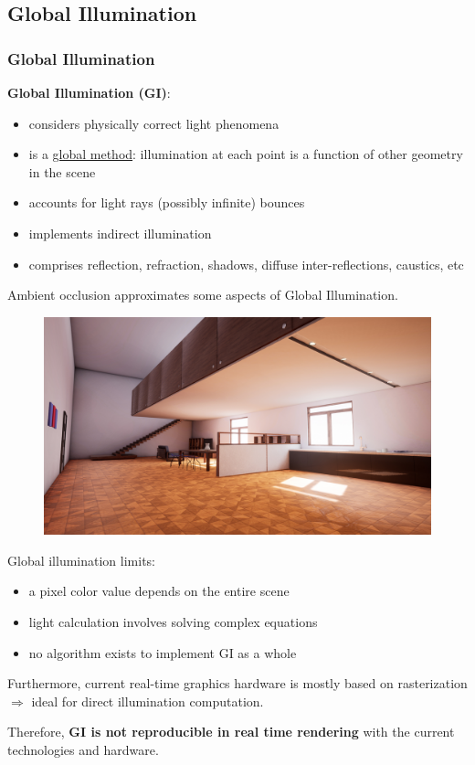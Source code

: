 \documentclass{beamer}
\newcommand{\redtext}[1]{\textcolor{myred}{#1}}
\begin{document}
\subsection{Global Illumination}
\begin{frame}[allowframebreaks]
\frametitle{Global Illumination}
\textbf{Global Illumination (GI)}:
\begin{itemize}
    \item \redtext{considers} physically correct light phenomena
    \item \redtext{is} a \underline{global method}: illumination at each point is a function of other geometry in the scene
    \item \redtext{accounts} for light rays (possibly infinite) bounces
    \item \redtext{implements} indirect illumination
    \item \redtext{comprises} reflection, refraction, shadows, diffuse inter-reflections, caustics, etc
\end{itemize}

Ambient occlusion approximates some aspects of Global Illumination.

\framebreak
\begin{figure}
    \centering
    \includegraphics[width=0.9\linewidth]{images/gi_room.jpg}
\end{figure}
\framebreak
Global illumination limits:
\begin{itemize}
    \item a pixel color value depends on the entire scene
    \item light calculation involves solving complex equations
    \item no algorithm exists to implement GI as a whole
\end{itemize}

Furthermore, current real-time graphics hardware is mostly based on rasterization $ \Rightarrow $ ideal for direct illumination computation.

Therefore, \textbf{GI is not reproducible in real time rendering} with the current technologies and hardware.
\end{frame}
\end{document}
